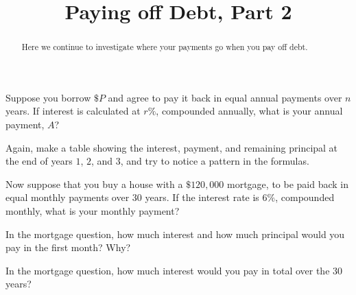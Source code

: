 \documentclass[,nooutcomes]{ximera}
\title{Paying off Debt, Part 2}
\begin{document}
\begin{abstract}
Here we continue to investigate where your payments go when you pay off debt.
\end{abstract}
\maketitle



\begin{question}
Suppose you borrow $\$P$ and agree to pay it back in equal annual
payments over $n$ years.  If interest is calculated at $r\%$,
compounded annually, what is your annual payment, $A$?
\begin{hint}
Again, make a table showing the interest, payment, and remaining
principal at the end of years $1$, $2$, and $3$, and try to notice a
pattern in the formulas.
\end{hint} 
\begin{freeResponse}
\end{freeResponse}
\end{question}

\begin{question}
Now suppose that you buy a house with a $\$120,000$ mortgage, to be
paid back in equal monthly payments over $30$ years.  If the interest
rate is $6\%$, compounded monthly, what is your monthly payment?
\begin{freeResponse}
\end{freeResponse}
\end{question}

\begin{question}
In the mortgage question, how much interest and how much principal
would you pay in the first month? Why?
\begin{freeResponse}
\end{freeResponse}
\end{question}

\begin{question}
In the mortgage question, how much interest would you pay in total
over the $30$ years?
\begin{freeResponse}
\end{freeResponse}
\end{question}
\end{document}
